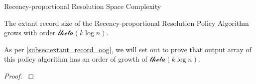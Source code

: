 \begin{theorem}{Recency-proportional Resolution Space Complexity}
\label{thm:recency-proportional-resolution-algo-space-complexity}

The \gls{extant record size} of the Recency-proportional Resolution Policy Algorithm grows with order $\mathcal{theta}{(k \log{n})}.$

\end{theorem}


As per \ref{subsec:extant_record_oog}, we will set out to prove that output array of this policy algorithm has an order of growth of $\mathcal{theta}{(k \log{n})}.$


\begin{proof}
\label{prf:recency-proportional-resolution-algo-space-complexity}



\end{proof}
